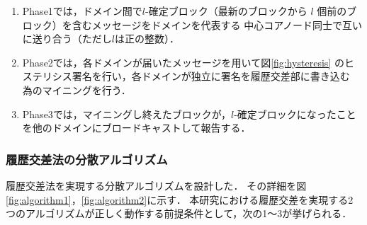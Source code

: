 \documentclass[a4paper,12pt]{jsarticle}
\begin{document}
\hspace{5mm}
%
\begin{enumerate}
    \item Phase1では，ドメイン間で$l$-確定ブロック（最新のブロックから 
          $l$ 個前のブロック）を含むメッセージをドメインを代表する
          中心コアノード同士で互いに送り合う（ただし$l$は正の整数）．

    \item Phase2では，各ドメインが届いたメッセージを用いて図\ref{fig:hysteresis}
          のヒステリシス署名を行い，各ドメインが独立に署名を履歴交差部に書き込む
          為のマイニングを行う．

    \item Phase3では，マイニングし終えたブロックが，$l$-確定ブロックになったこと
          を他のドメインにブロードキャストして報告する．
\end{enumerate}
%
\hspace{5mm}

      \subsubsection{履歴交差法の分散アルゴリズム}

履歴交差法を実現する分散アルゴリズム\cite{manabe}を設計した．
その詳細を図 \ref{fig:algorithm1}，\ref{fig:algorithm2}に示す．
本研究における履歴交差を実現する2つのアルゴリズムが正しく動作する前提条件として，次の1〜3が挙げられる．
\end{document}
